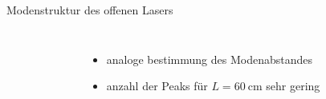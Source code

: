 \documentclass[10pt, aspectratio=169]{beamer}
\begin{document}
\begin{frame}{Modenstruktur des offenen Lasers}
  \begin{columns}
    \begin{figure}
    \end{figure}
    \begin{itemize}
    \item<1-> analoge bestimmung des Modenabstandes
    \item<2-> anzahl der Peaks f\"ur \(L=\SI{60}{\centi\meter}\) sehr
      gering
    \end{itemize}
  \end{columns}
\end{frame}
\end{document}
